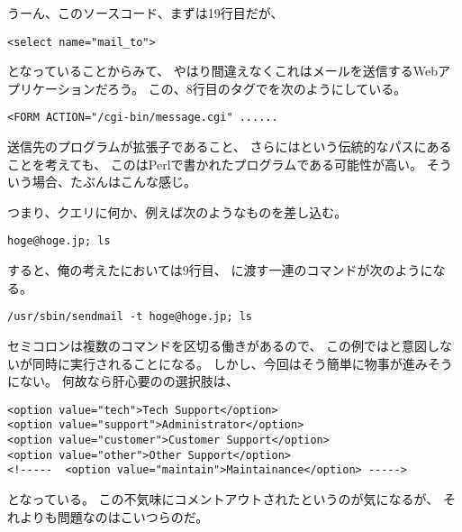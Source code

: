 

うーん、このソースコード、まずは19行目だが、

\begin{lstlisting}[style=html, firstnumber=19]
<select name="mail_to">
\end{lstlisting}

となっていることからみて、
やはり間違えなくこれはメールを送信するWebアプリケーションだろう。
この、8行目のタグでを次のようにしている。

\begin{lstlisting}[style=html, firstnumber=8]
<FORM ACTION="/cgi-bin/message.cgi" ......
\end{lstlisting}

送信先のプログラムが拡張子であること、
さらにはという伝統的なパスにあることを考えても、
このはPerlで書かれたプログラムである可能性が高い。
そういう場合、たぶんはこんな感じ。



つまり、クエリに何か、例えば次のようなものを差し込む。

\begin{lstlisting}
hoge@hoge.jp; ls
\end{lstlisting}

すると、俺の考えたにおいては9行目、
に渡す一連のコマンドが次のようになる。

\begin{lstlisting}
/usr/sbin/sendmail -t hoge@hoge.jp; ls
\end{lstlisting}

セミコロンは複数のコマンドを区切る働きがあるので、
この例ではと意図しないが同時に実行されることになる。
しかし、今回はそう簡単に物事が進みそうにない。
何故なら肝心要のの選択肢は、

\begin{lstlisting}[style=html, firstnumber=20]
<option value="tech">Tech Support</option>
<option value="support">Administrator</option>
<option value="customer">Customer Support</option>
<option value="other">Other Support</option>
<!-----  <option value="maintain">Maintainance</option> ----->
\end{lstlisting}

となっている。
この不気味にコメントアウトされたというのが気になるが、
それよりも問題なのはこいつらのだ。

